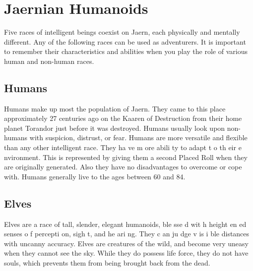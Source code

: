 \chapter{Jaernian Humanoids}
\label{ch:jaern-humanoids}
\setlength{\columnsep}{\defcolwidth}\begin{multicols*}{2}
Five races of intelligent beings coexist on Jaern,
each physically and mentally different. Any of the following
races can be used as adventurers. It is important to remember
their characteristics and abilities when you play the role of
various human and non-human races.
\section{Humans}
Humans make up most the population of Jaern.
They came to this place approximately 27 centuries ago on
the Kaaren of Destruction from their home planet Torandor
just before it was destroyed. Humans usually look upon non-
humans with suspicion, distrust, or fear. Humans are more
versatile and flexible than any other intelligent race. They
ha ve m ore abili ty to adapt t o th eir e nvironment. This is
represented by giving them a second Placed Roll when they
are originally generated. Also they have no disadvantages to
overcome or cope with. Humans generally live to the ages
between 60 and 84.
\section{Elves}
Elves are a race of tall, slender, elegant humanoids,
ble sse d wit h height en ed senses o f percepti on, sigh t, and
he ari ng. They c an ju dge v is i ble distances with uncanny
accuracy. Elves are creatures of the wild, and become very
uneasy when they cannot see the sky. While they do possess
life force, they do not have souls, which prevents them from
being brought back from the dead.

\end{multicols*}
